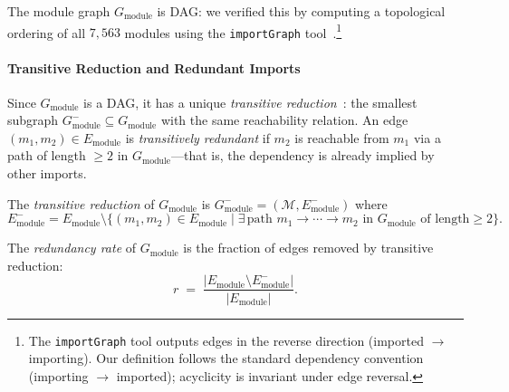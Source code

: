 The module graph $G_{\mathrm{module}}$ is DAG: we verified this by computing a topological ordering of all $7{,}563$ modules using the \texttt{importGraph} tool~\cite{importgraph}.\footnote{The \texttt{importGraph} tool outputs edges in the reverse direction (imported $\to$ importing). Our definition follows the standard dependency convention (importing $\to$ imported); acyclicity is invariant under edge reversal.} 

\paragraph{Transitive Reduction and Redundant Imports}
\label{sec:transitive-reduction}

Since $G_{\mathrm{module}}$ is a DAG, it has a unique \emph{transitive reduction}~\cite{ahu1972}: the smallest subgraph $G_{\mathrm{module}}^{-} \subseteq G_{\mathrm{module}}$ with the same reachability relation. An edge $(m_1, m_2) \in E_{\mathrm{module}}$ is \emph{transitively redundant} if $m_2$ is reachable from $m_1$ via a path of length $\ge 2$ in $G_{\mathrm{module}}$---that is, the dependency is already implied by other imports.

\begin{definition}
The \emph{transitive reduction} of $G_{\mathrm{module}}$ is $G_{\mathrm{module}}^{-} = (\mathcal{M}, E_{\mathrm{module}}^{-})$ where
\[
  E_{\mathrm{module}}^{-} = E_{\mathrm{module}} \setminus \{(m_1, m_2)\in E_{\mathrm{module}} \mid \exists\, \text{path } m_1 \to \cdots \to m_2 \text{ in } G_{\mathrm{module}} \text{ of length} \ge 2\}.
\]
\end{definition}

\begin{definition}
\label{def:redundancy-rate}
The \emph{redundancy rate} of $G_{\mathrm{module}}$ is the fraction of edges removed by transitive reduction:
\[
  r \;=\; \frac{|E_{\mathrm{module}} \setminus E_{\mathrm{module}}^{-}|}{|E_{\mathrm{module}}|}.
\]
\end{definition}

